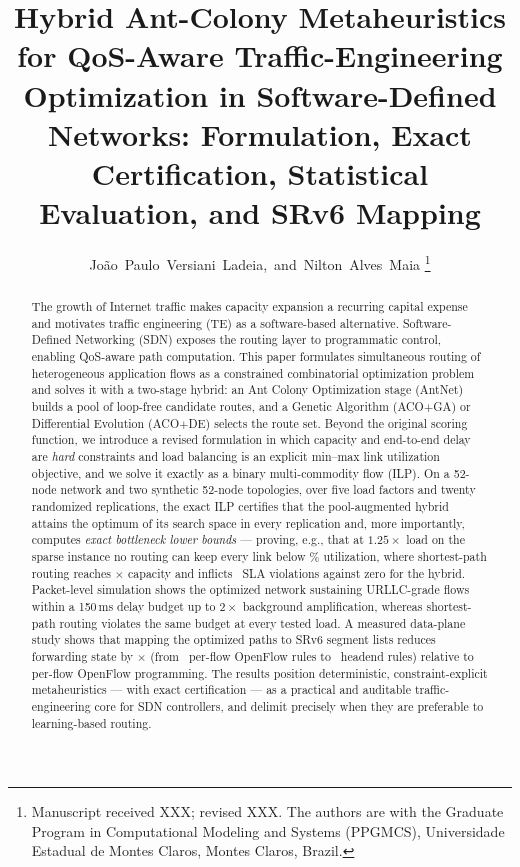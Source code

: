 \documentclass[journal]{IEEEtran}
\begin{document}
\title{Hybrid Ant-Colony Metaheuristics for QoS-Aware Traffic-Engineering
Optimization in Software-Defined Networks: Formulation, Exact Certification,
Statistical Evaluation, and SRv6 Mapping}
\author{João~Paulo~Versiani~Ladeia,~and~Nilton~Alves~Maia%
\thanks{Manuscript received XXX; revised XXX. The authors are with the
Graduate Program in Computational Modeling and Systems (PPGMCS),
Universidade Estadual de Montes Claros, Montes Claros, Brazil.}}


\maketitle

\begin{abstract}
The growth of Internet traffic makes capacity expansion a recurring capital
expense and motivates traffic engineering (TE) as a software-based
alternative. Software-Defined Networking (SDN) exposes the routing layer to
programmatic control, enabling QoS-aware path computation. This paper
formulates simultaneous routing of heterogeneous application flows as a
constrained combinatorial optimization problem and solves it with a two-stage
hybrid: an Ant Colony Optimization stage (AntNet) builds a pool of loop-free
candidate routes, and a Genetic Algorithm (ACO$+$GA) or Differential Evolution
(ACO$+$DE) selects the route set. Beyond the original scoring function, we
introduce a revised formulation in which capacity and end-to-end delay are
\emph{hard} constraints and load balancing is an explicit min--max link
utilization objective, and we solve it exactly as a binary multi-commodity
flow (ILP). On a 52-node network and two synthetic 52-node topologies, over
five load factors and twenty randomized replications, the exact ILP
certifies that the pool-augmented hybrid attains the optimum of its search
space in every replication and, more importantly, computes \emph{exact
bottleneck lower bounds} --- proving, e.g., that at $1.25\times$ load on the
sparse instance no routing can keep every link below \IlpZmaiaHighPct\%
utilization, where shortest-path routing reaches \DjMaxUtil$\times$
capacity and inflicts \DjViolHigh\ SLA violations against zero for the
hybrid. Packet-level simulation shows
the optimized network sustaining URLLC-grade flows within a 150\,ms delay
budget up to $2\times$ background amplification, whereas shortest-path
routing violates the same budget at every tested load. A measured data-plane
study shows that mapping the optimized paths to SRv6 segment lists reduces
forwarding state by \SrvRedMaia$\times$ (from \SrvOfMaia\ per-flow OpenFlow
rules to \SrvSrRules\ headend rules) relative to per-flow OpenFlow
programming. The results position deterministic, constraint-explic\-it
metaheuristics --- with exact certification --- as a practical and auditable
traffic-engineering core for SDN controllers, and delimit precisely when
they are preferable to learning-based routing.
\end{abstract}
\end{document}
